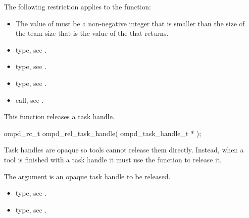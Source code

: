 \restrictions

The following restriction applies to the  function:

\begin{itemize}
\item The value of  must be a non-negative integer that is 
      smaller than the size of the team size that is the value of the 
       that  returns.
\end{itemize}

\crossreferences
\begin{itemize}
\item {} type, 
see .

\item {} type, see .

\item {} type, see .

\item {} call, 
see .
\end{itemize}



\label{subsubsubsec:ompd_rel_task_handle}
\summary
This  function releases a task handle.

\format
\begin{cspecific}
\begin{ompSyntax}
ompd_rc_t ompd_rel_task_handle(
  ompd_task_handle_t *
);
\end{ompSyntax}
\end{cspecific}

\descr
Task handles are opaque so tools cannot release them directly. Instead, 
when a tool is finished with a task handle it must use the 
 function to release it.

\argdesc
The  argument is an opaque task handle to be released.

\crossreferences
\begin{itemize}
\item {} type, see .

\item {} type, see .
\end{itemize}



